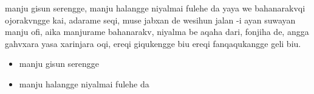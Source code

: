 \documentclass{article}
\begin{document}

manju gisun serengge, manju halangge niyalmai fulehe da yaya we bahanarakvqi ojorakvngge kai, adarame seqi, muse jabxan de wesihun jalan -i ayan suwayan manju ofi, aika manjurame bahanarakv, niyalma be aqaha dari, fonjiha de, angga gahvxara yasa xarinjara oqi, ereqi giqukengge biu ereqi fanqaqukangge geli biu.

\begin{itemize}
    \item manju gisun serengge
    \item manju halangge niyalmai fulehe da
\end{itemize}
\end{document}
